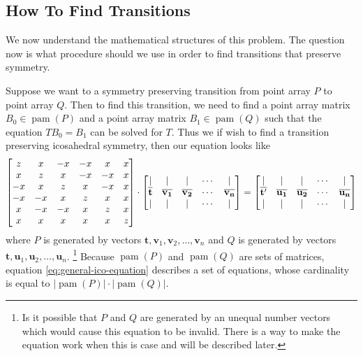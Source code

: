 \documentclass[a4paper,10pt]{article}
\let\oldfootnote\footnote
\renewcommand{\footnote}{\unskip\oldfootnote}
\theoremstyle{plain}
\theoremstyle{definition}
\theoremstyle{remark}
\renewcommand{\vec}[1]{\mathbf{#1}}
\newcommand\abs[1]{\left|#1\right|}
\DeclareMathOperator{\pam}{pam}
\begin{document}
\subsection{How To Find Transitions}
We now understand the mathematical structures of this problem.
The question now is what procedure should we use in order to find transitions that preserve symmetry.

Suppose we want to a symmetry preserving transition from point array \( P \) to point array \( Q \).
Then to find this transition, we need to find a point array matrix \( B_0 \in \pam(P) \) and a point array matrix \( B_1 \in \pam(Q) \) such that the equation \( TB_0 = B_1 \) can be solved for \( T \).
Thus we if wish to find a transition preserving icosahedral symmetry, then our equation looks like
\begin{equation}
	\begin{bmatrix}
		z  & x  & -x & -x & x  & x \\
		x  & z  & x  & -x & -x & x \\
		-x & x  & z  & x  & -x & x \\
		-x & -x & x  & z  & x  & x \\
		x  & -x & -x & x  & z  & x \\
		x  & x  & x  & x  & x  & z
	\end{bmatrix}
	\cdot
	\begin{bmatrix}
		| & | & | & \cdots & | \\
		\icobar{t} & \icobar{v_1} & \icobar{v_2} & \cdots & \icobar{v_n} \\
		| & | & | & \cdots & |
	\end{bmatrix}
	=
	\begin{bmatrix}
		| & | & | & \cdots & | \\
		\icobar{t'} & \icobar{u_1} & \icobar{u_2} & \cdots & \icobar{u_n} \\
		| & | & | & \cdots & |
	\end{bmatrix}
	\label{eq:general-ico-equation}
\end{equation}
where \( P \) is generated by vectors \(\vec{t}, \vec{v}_1, \vec{v}_2, \dots, \vec{v}_n\) and \( Q \) is generated by vectors \(\vec{t}, \vec{u}_1, \vec{u}_2, \dots, \vec{u}_n\).
\footnote{
	Is it possible that \( P \) and \( Q \) are generated by an unequal number vectors which would cause this equation to be invalid. 
	There is a way to make the equation work when this is case and will be described later.
	}
Because \( \pam(P) \) and \( \pam(Q) \) are sets of matrices, equation \ref{eq:general-ico-equation} describes a set of equations, whose cardinality is equal to \( \abs{\pam(P)}\cdot\abs{\pam(Q)}\).
\end{document}
